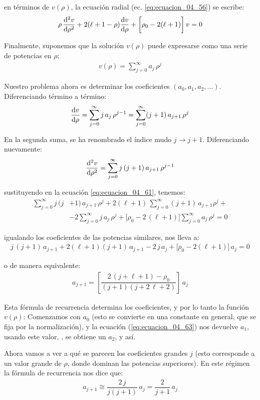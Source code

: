 en términos de $v(\rho)$, la  ecuación radial (ec. \ref{eq:ecuacion_04_56}) se escribe:
\begin{align}
\rho \, \dv[2]{v}{\rho} + 2 (\ell + 1 - \rho) \dv{v}{\rho} + \bigg[ \rho_{0} - 2 (\ell + 1) \bigg] \, v = 0
\label{eq:ecuacion_04_61}
\end{align}

Finalmente, suponemos que la solución $v(\rho)$ puede expresarse como una serie de potencias en $\rho$:
\begin{align}
v(\rho) = \sum_{j=0}^{\infty} a_{j} \, \rho^{j} 
\label{eq:ecuacion_04_62}
\end{align}

Nuestro problema ahora es determinar los coeficientes $(a_{0}, a_{1}, a_{2}, \ldots)$. Diferenciando término a término:
\begin{align*}
\dv{v}{\rho} = \sum_{j=0}^{\infty} j \, a_{j} \, \rho^{j - 1} = \sum_{j=0}^{\infty} (j + 1) \, a_{j+1} \, \rho^{j}
\end{align*}

En la segunda suma, se ha renombrado el índice mudo $j \to j + 1$. Diferenciando nuevamente:
\begin{align*}
\dv[2]{v}{\rho} = \sum_{j=0}^{\infty} j \, (j+1) \, a_{j+1} \, \rho^{j-1}
\end{align*}

sustituyendo en la ecuación \ref{eq:ecuacion_04_61}, tenemos:
\begin{align*}
\sum_{j=0}^{\infty} j \, (j &+ 1) \, a_{j+1} \, \rho^{j} + 2 (\ell + 1) \, \sum_{j=0}^{\infty} (j + 1) \, a_{j+1} \rho^{j} + \\[0.5em]
&- 2 \sum_{j=0}^{\infty} j \, a_{j} \, \rho^{j} + \bigg[ \rho_{0} - 2 \, (\ell + 1) \bigg] \sum_{j=0}^{\infty} a_{j} \, \rho^{j} = 0
\end{align*}

igualando los coeficientes de las potencias similares, nos lleva a:
\begin{align*}
j \, (j + 1) \, a_{j+1} + 2(\ell + 1)(j + 1) \, a_{j+1} - 2 \, j \, a_{j} + \bigg[ \rho_{0} - 2(\ell + 1) \bigg] \, a_{j} = 0
\end{align*}

o de manera equivalente:
\begin{align}
a_{j+1} = \left[ \dfrac{2 \, (j + \ell + 1) - \rho_{0}}{(j + 1)(j + 2 \, \ell + 2)} \right] \, a_{j}
\label{eq:ecuacion_04_63}
\end{align}

Esta fórmula de recurrencia determina los coeficientes, y por lo tanto la función $v(\rho)$: Comenzamos con $a_{0}$ (esto se convierte en una constante en general, que se fija por la normalización), y la ecuación (\ref{eq:ecuacion_04_63}) nos devuelve $a_{1}$, usando este valor, , se obtiene un $a_{2}$, y así.
\par
Ahora vamos a ver a qué se parecen los coeficientes grandes $j$ (esto corresponde a un valor grande de $\rho$, donde dominan las potencias superiores). En este régimen la fórmula de recurrencia nos dice que:
\begin{align*}
a_{j+1} \cong \dfrac{2 \, j}{j (j + 1)} \, a_{j} =  \dfrac{2}{j + 1} \, a_{j}
\end{align*}

